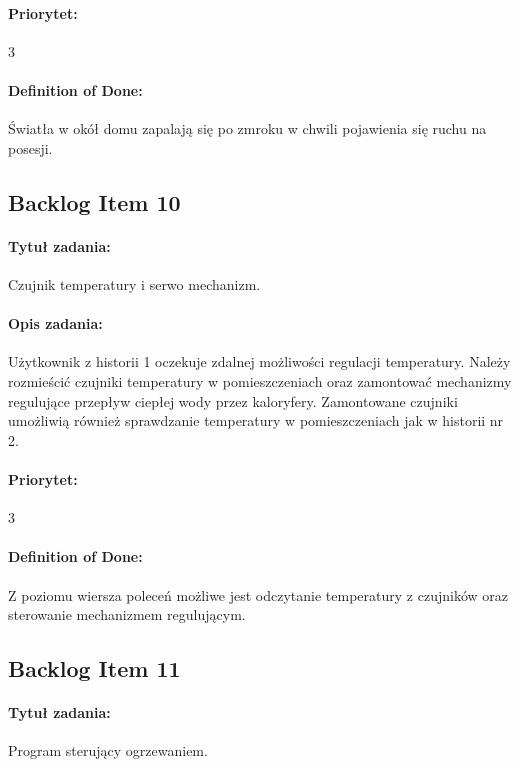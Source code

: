 	\paragraph{Priorytet:}
	3
	
	\paragraph{Definition of Done:}
	Światła w okół domu zapalają się po zmroku w chwili pojawienia się ruchu na posesji.



	\subsection{Backlog Item 10}
	\paragraph{Tytuł zadania:}
	Czujnik temperatury i serwo mechanizm.
	
	\paragraph{Opis zadania:} 
	Użytkownik z historii 1 oczekuje zdalnej możliwości regulacji temperatury. Należy rozmieścić czujniki temperatury w pomieszczeniach oraz zamontować mechanizmy regulujące przepływ ciepłej wody przez kaloryfery. Zamontowane czujniki umożliwią również sprawdzanie temperatury w pomieszczeniach jak w historii nr 2.
	
	\paragraph{Priorytet:}
	3
	
	\paragraph{Definition of Done:} 
	Z poziomu wiersza poleceń możliwe jest odczytanie temperatury z czujników oraz sterowanie mechanizmem regulującym.
	


\subsection{Backlog Item 11}
\paragraph{Tytuł zadania:}
Program sterujący ogrzewaniem.

